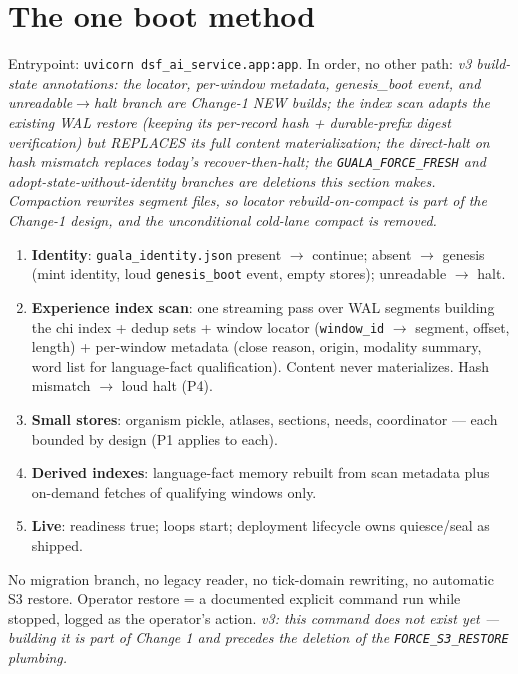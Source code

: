 \documentclass[11pt]{article}
\begin{document}
\section{The one boot method}\label{sec:boot}

Entrypoint: \texttt{uvicorn dsf\_ai\_service.app:app}. In order, no other
path:
\emph{v3 build-state annotations: the locator, per-window metadata,
genesis\_boot event, and unreadable$\to$halt branch are Change-1 NEW
builds; the index scan adapts the existing WAL restore (keeping its
per-record hash + durable-prefix digest verification) but REPLACES its
full content materialization; the direct-halt on hash mismatch replaces
today's recover-then-halt; the \texttt{GUALA\_FORCE\_FRESH} and
adopt-state-without-identity branches are deletions this section makes.
Compaction rewrites segment files, so locator rebuild-on-compact is part
of the Change-1 design, and the unconditional cold-lane compact is
removed.}
\begin{enumerate}[nosep]
  \item \textbf{Identity}: \texttt{guala\_identity.json} present $\to$
        continue; absent $\to$ genesis (mint identity, loud
        \texttt{genesis\_boot} event, empty stores); unreadable $\to$ halt.
  \item \textbf{Experience index scan}: one streaming pass over WAL
        segments building the chi index + dedup sets + window locator
        (\texttt{window\_id} $\to$ segment, offset, length) + per-window
        metadata (close reason, origin, modality summary, word list for
        language-fact qualification). Content never materializes. Hash
        mismatch $\to$ loud halt (P4).
  \item \textbf{Small stores}: organism pickle, atlases, sections, needs,
        coordinator — each bounded by design (P1 applies to each).
  \item \textbf{Derived indexes}: language-fact memory rebuilt from scan
        metadata plus on-demand fetches of qualifying windows only.
  \item \textbf{Live}: readiness true; loops start; deployment lifecycle
        owns quiesce/seal as shipped.
\end{enumerate}
No migration branch, no legacy reader, no tick-domain rewriting, no
automatic S3 restore. Operator restore = a documented explicit command run
while stopped, logged as the operator's action. \emph{v3: this command
does not exist yet — building it is part of Change 1 and precedes the
deletion of the \texttt{FORCE\_S3\_RESTORE} plumbing.}
\end{document}
